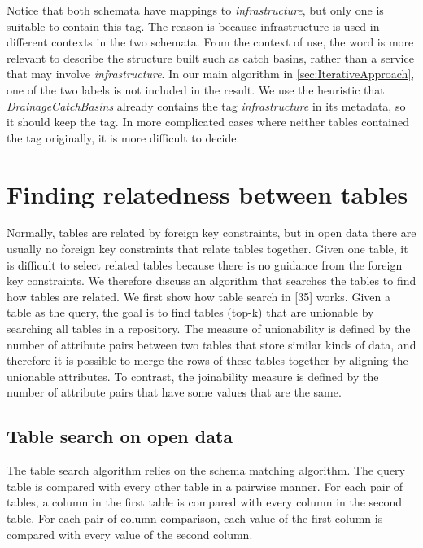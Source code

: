 Notice that both schemata have mappings to \textit{infrastructure}, but only one is suitable to contain this tag. The reason is because infrastructure is used in different contexts in the two schemata. From the context of use, the word is more relevant to describe the structure built such as catch basins, rather than a service that may involve \textit{infrastructure}. In our main algorithm in \autoref{sec:IterativeApproach}, one of the two labels is not included in the result. We use the heuristic that \textit{DrainageCatchBasins} already contains the tag \textit{infrastructure} in its metadata, so it should keep the tag. In more complicated cases where neither tables contained the tag originally, it is more difficult to decide.

\section{Finding relatedness between tables}
\label{sec:FindingRelatednessBetweenTables}

Normally, tables are related by foreign key constraints, but in open data there are usually no foreign key constraints that relate tables together. Given one table, it is difficult to select related tables because there is no guidance from the foreign key constraints. We therefore discuss an algorithm that searches the tables to find how tables are related. We first show how table search in \cite{Nargesian2018Table}[35] works. Given a table as the query, the goal is to find tables (top-k) that are unionable by searching all tables in a repository. The measure of unionability is defined by the number of attribute pairs between two tables that store similar kinds of data, and therefore it is possible to merge the rows of these tables together by aligning the unionable attributes. To contrast, the joinability measure is defined by the number of attribute pairs that have some values that are the same.

\subsection{Table search on open data}
\label{ssec:TableSearchOnOpenData}

The table search algorithm relies on the schema matching algorithm. The query table is compared with every other table in a pairwise manner. For each pair of tables, a column in the first table is compared with every column in the second table. For each pair of column comparison, each value of the first column is compared with every value of the second column.

